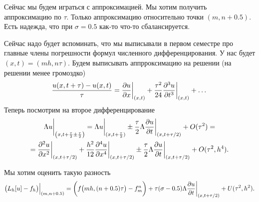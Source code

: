 Сейчас мы будем играться с аппроксимацией. Мы хотим получить аппроксимацию по $\tau$. Только аппроксимацию относительно точки $(m,n+0.5)$. Есть надежда, что при $\sigma=0.5$ как-то что-то сбалансируется.

Сейчас надо будет вспоминать, что мы выписывали в первом семестре про главные члены погрешности формул численного дифференцирования. У нас будет $(x,t) = (mh,n\tau)$. Будем выписывать аппрроксимацию на решении (на решении менее громоздко)
\[
  \frac{u(x,t+\tau) - u(x,t)}{\tau} = \frac{\partial u}{\partial x}\bigg|_{(x,t)} + \frac{\tau^2}{24} \frac{\partial ^3u}{\partial t^3}\bigg|_{(x,t)} + \dots
\]
Теперь посмотрим на второе дифференцирование
\begin{multline*}
  \Lambda u \bigg|_{\left(x,t+\frac\tau2\pm\frac\tau2\right)} = \Lambda u\bigg|_{(x,t+\frac\tau2)} \pm\frac\tau2 \Lambda \frac{\partial u}{\partial t}\bigg|_{(x,t+\tau/2)} + O(\tau^2) = \\=
  \frac{\partial ^2u}{\partial x^2}\bigg|_{(x,t+\tau/2)} + \frac{h^2}{12} \frac{\partial ^4u}{\partial x^4}\bigg|_{(x,t+\tau/2)} \pm \frac\tau2 \Lambda \frac{\partial u}{\partial t}\bigg|_{(x,t+\tau/2)} + O(\tau^2,h^4).
\end{multline*}

Мы хотим оценить такую разность
\[
  \big(L_h[u] - f_h\big)\Big|_{(m,n+0.5)} = \bigg( f\big(mh,(n+0.5)\tau\big) - f_m^n\bigg) + \tau(\sigma-0.5)\Lambda\frac{\partial u}{\partial t}\bigg|_{(x,t+\tau/2)} + U(\tau^2,h^2).
\]
